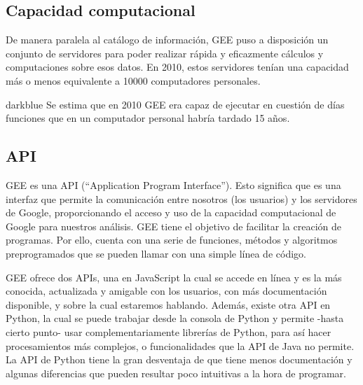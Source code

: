 \documentclass[
  12pt,
  letterpaper,
  twoside]{book}
\begin{document}
\hypertarget{capacidad-computacional}{%
\subsection{Capacidad computacional}\label{capacidad-computacional}}

De manera paralela al catálogo de información, GEE puso a disposición un conjunto de servidores para poder realizar rápida y eficazmente cálculos y computaciones sobre esos datos. En 2010, estos servidores tenían una capacidad más o menos equivalente a 10000 computadores personales.

\begin{bluebox2}

\begin{awesomeblock}{5pt}{\faLightbulb}{darkblue}
Se estima que en 2010 GEE era capaz de ejecutar en cuestión de días funciones que en un computador personal habría tardado 15 años.

\end{awesomeblock}

\end{bluebox2}

\hypertarget{api}{%
\subsection{API}\label{api}}

GEE es una API (``Application Program Interface''). Esto significa que es una interfaz que permite la comunicación entre nosotros (los usuarios) y los servidores de Google, proporcionando el acceso y uso de la capacidad computacional de Google para nuestros análisis. GEE tiene el objetivo de facilitar la creación de programas. Por ello, cuenta con una serie de funciones, métodos y algoritmos preprogramados que se pueden llamar con una simple línea de código.

GEE ofrece dos APIs, una en JavaScript la cual se accede en línea y es la más conocida, actualizada y amigable con los usuarios, con más documentación disponible, y sobre la cual estaremos hablando. Además, existe otra API en Python, la cual se puede trabajar desde la consola de Python y permite -hasta cierto punto- usar complementariamente librerías de Python, para así hacer procesamientos más complejos, o funcionalidades que la API de Java no permite. La API de Python tiene la gran desventaja de que tiene menos documentación y algunas diferencias que pueden resultar poco intuitivas a la hora de programar.
\end{document}
